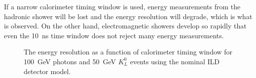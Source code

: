 If a narrow calorimeter timing window is used, energy measurements from the hadronic shower will be lost and the energy resolution will degrade, which is what is observed.  On the other hand, electromagnetic showers develop so rapidly that even the 10~ns time window does not reject many energy measurements. 

\begin{figure}[h!]
\caption[The energy resolution as a function of calorimeter timing window for \protect{} 100~GeV photons and \protect{} 50~GeV $K^{0}_{L}$ events using the nominal ILD detector model.]{The energy resolution as a function of calorimeter timing window for \protect{} 100~GeV photons and \protect{} 50~GeV $K^{0}_{L}$ events using the nominal ILD detector model.}
\label{fig:ertimingcuts}
\end{figure}

